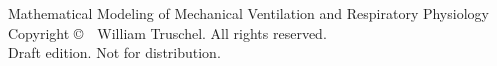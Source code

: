 \thispagestyle{empty}
\vspace*{\fill}
{\small\noindent Mathematical Modeling of Mechanical Ventilation and Respiratory Physiology\\[4pt]
Copyright \copyright\ \the\year\ William Truschel. All rights reserved.\\[4pt]
Draft edition. Not for distribution.\par}
\cleardoublepage
